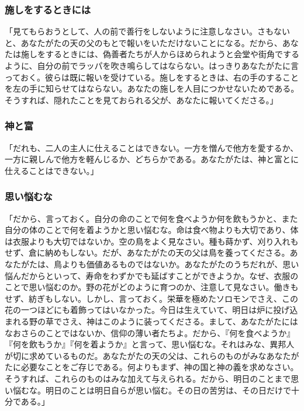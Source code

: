 \documentclass[uplatex,dvipdfmx]{jsarticle} \usepackage{mystyle}%
\begin{document}
\subsubsection*{施しをするときには}

「見てもらおうとして、人の前で善行をしないように注意しなさい。さもないと、あなたがたの天の父のもとで報いをいただけないことになる。だから、あなたは施しをするときには、偽善者たちが人からほめられようと会堂や街角でするように、自分の前でラッパを吹き鳴らしてはならない。はっきりあなたがたに言っておく。彼らは既に報いを受けている。施しをするときは、右の手のすることを左の手に知らせてはならない。あなたの施しを人目につかせないためである。そうすれば、隠れたことを見ておられる父が、あなたに報いてくださる。」


\subsubsection*{神と富}



「だれも、二人の主人に仕えることはできない。一方を憎んで他方を愛するか、一方に親しんで他方を軽んじるか、どちらかである。あなたがたは、神と富とに仕えることはできない。」

\subsubsection*{思い悩むな}

「だから、言っておく。自分の命のことで何を食べようか何を飲もうかと、また自分の体のことで何を着ようかと思い悩むな。命は食べ物よりも大切であり、体は衣服よりも大切ではないか。空の鳥をよく見なさい。種も蒔かず、刈り入れもせず、倉に納めもしない。だが、あなたがたの天の父は鳥を養ってくださる。あなたがたは、鳥よりも価値あるものではないか。あなたがたのうちだれが、思い悩んだからといって、寿命をわずかでも延ばすことができようか。なぜ、衣服のことで思い悩むのか。野の花がどのように育つのか、注意して見なさい。働きもせず、紡ぎもしない。しかし、言っておく。栄華を極めたソロモンでさえ、この花の一つほどにも着飾ってはいなかった。今日は生えていて、明日は炉に投げ込まれる野の草でさえ、神はこのように装ってくださる。まして、あなたがたにはなおさらのことではないか、信仰の薄い者たちよ。だから、『何を食べようか』『何を飲もうか』『何を着ようか』と言って、思い悩むな。それはみな、異邦人が切に求めているものだ。あなたがたの天の父は、これらのものがみなあなたがたに必要なことをご存じである。何よりもまず、神の国と神の義を求めなさい。そうすれば、これらのものはみな加えて与えられる。だから、明日のことまで思い悩むな。明日のことは明日自らが思い悩む。その日の苦労は、その日だけで十分である。」
\end{document}

